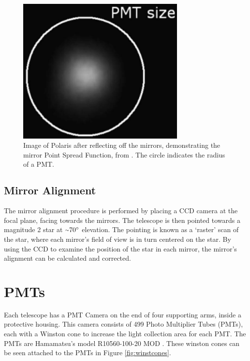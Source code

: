 \begin{figure}[ht]
  \centering
  \includegraphics[width=0.75\textwidth]{images/mirror_polaris.eps}
  \caption[Polaris PSF]{
    Image of Polaris after reflecting off the mirrors, demonstrating the mirror Point Spread Function, from \cite{Veritas_Detector}.
    The circle indicates the radius of a PMT.}
  \label{fig:mirrorpolaris}
\end{figure}

\subsection{Mirror Alignment}
The mirror alignment procedure is performed by placing a CCD camera at the focal plane, facing towards the mirrors.
The telescope is then pointed towards a magnitude 2 star at $ \nicetilde \ang{70} $ elevation.
The pointing is known as a `raster' scan of the star, where each mirror's field of view is in turn centered on the star.
By using the CCD to examine the position of the star in each mirror, the mirror's alignment can be calculated and corrected.



\section{PMTs}\label{sec:pmts}

Each telescope has a PMT Camera on the end of four supporting arms, inside a protective housing.
This camera consists of 499 Photo Multiplier Tubes (PMTs), each with a Winston cone to increase the light collection area for each PMT.
The PMTs are Hamamatsu's model R10560-100-20 MOD \cite{pmtmodels}.
These winston cones can be seen attached to the PMTs in Figure \ref{fig:winstcones}.

